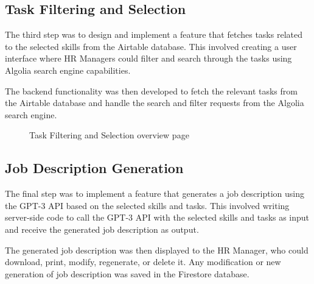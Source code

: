 \newpage
\subsection{Task Filtering and Selection} 
The third step was to design and implement a feature that fetches tasks related to the selected skills from the Airtable database. This involved creating a user interface where HR Managers could filter and search through the tasks using Algolia search engine capabilities.

The backend functionality was then developed to fetch the relevant tasks from the Airtable database and handle the search and filter requests from the Algolia search engine.

\begin{figure}[H]
    \centering
    \caption{ Task Filtering and Selection overview page}
    \label{fig:Task-Filtering-and-Selection-overview-page}
\end{figure}

\newpage
\subsection{Job Description Generation} 
The final step was to implement a feature that generates a job description using the GPT-3 API based on the selected skills and tasks. This involved writing server-side code to call the GPT-3 API with the selected skills and tasks as input and receive the generated job description as output.

The generated job description was then displayed to the HR Manager, who could download, print, modify, regenerate, or delete it. Any modification or new generation of job description was saved in the Firestore database.


